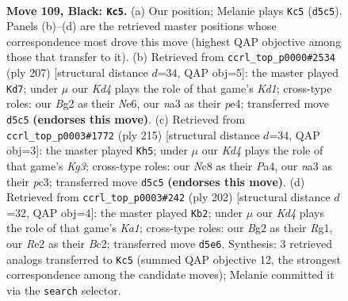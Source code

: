 \documentclass[11pt]{article}
\begin{document}
\clearpage

\begin{figure}[p]\centering
\begin{subfigure}{0.46\textwidth}\centering
\resizebox{\linewidth}{!}{%
\newchessgame
\chessboard[
  setfen={2n4K/8/p7/P2k1p1p/5B2/N5P1/4r1b1/R7 b - - 29 109},
  showmover=false,
  pgfstyle=straightmove, color=movearrow, markmove={d5-c5}
]}
\caption{}
\end{subfigure}\hfill
\begin{subfigure}{0.46\textwidth}\centering
\resizebox{\linewidth}{!}{%
\newchessgame
\chessboard[
  setfen={3k4/8/p1pBn1p1/8/P3P2P/5K2/1P6/8 b - - 8 104},
  showmover=false,
  pgfstyle=straightmove, color=movearrow, markmove={d8-d7}
]}
\caption{}
\end{subfigure}
\\[4pt]
\begin{subfigure}{0.46\textwidth}\centering
\resizebox{\linewidth}{!}{%
\newchessgame
\chessboard[
  setfen={8/8/3B2k1/6p1/p1p5/P1P2PpP/8/1b4K1 b - - 2 108},
  showmover=false,
  pgfstyle=straightmove, color=movearrow, markmove={g6-h5}
]}
\caption{}
\end{subfigure}\hfill
\begin{subfigure}{0.46\textwidth}\centering
\resizebox{\linewidth}{!}{%
\newchessgame
\chessboard[
  setfen={7k/r2b4/8/2pNP1b1/2P4p/2P5/2B5/K5R1 w - - 13 102},
  showmover=false,
  pgfstyle=straightmove, color=movearrow, markmove={a1-b2}
]}
\caption{}
\end{subfigure}
\caption{\textbf{Move 109, Black: \texttt{Kc5}.} (a) Our position; Melanie plays \texttt{Kc5} (\texttt{d5c5}). Panels (b)--(d) are the retrieved master positions whose correspondence most drove this move (highest QAP objective among those that transfer to it). (b) Retrieved from \texttt{ccrl\_top\_p0000\#2534} (ply 207) [structural distance $d$=34, QAP obj=5]: the master played \texttt{Kd7}; under $\mu$ our \emph{Kd4} plays the role of that game's \emph{Kd1}; cross-type roles: our \emph{B}g2 as their \emph{N}e6, our \emph{n}a3 as their \emph{p}e4; transferred move \texttt{d5c5} \textbf{(endorses this move)}. (c) Retrieved from \texttt{ccrl\_top\_p0003\#1772} (ply 215) [structural distance $d$=34, QAP obj=3]: the master played \texttt{Kh5}; under $\mu$ our \emph{Kd4} plays the role of that game's \emph{Kg3}; cross-type roles: our \emph{N}c8 as their \emph{P}a4, our \emph{n}a3 as their \emph{p}c3; transferred move \texttt{d5c5} \textbf{(endorses this move)}. (d) Retrieved from \texttt{ccrl\_top\_p0003\#242} (ply 202) [structural distance $d$=32, QAP obj=4]: the master played \texttt{Kb2}; under $\mu$ our \emph{Kd4} plays the role of that game's \emph{Ka1}; cross-type roles: our \emph{B}g2 as their \emph{R}g1, our \emph{R}e2 as their \emph{B}c2; transferred move \texttt{d5e6}. Synthesis: 3 retrieved analogs transferred to \texttt{Kc5} (summed QAP objective 12, the strongest correspondence among the candidate moves); Melanie committed it via the \texttt{search} selector.}
\label{fig:thought-m217}
\end{figure}
\end{document}
